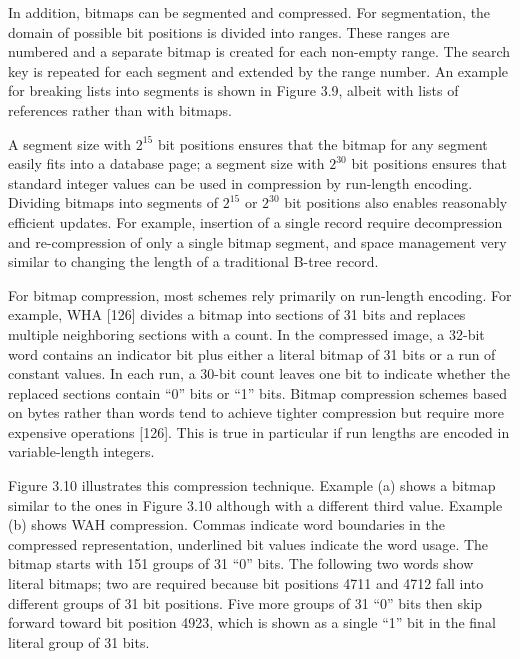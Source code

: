 In addition, bitmaps can be segmented and compressed. For segmentation,
the domain of possible bit positions is divided into ranges. These
ranges are numbered and a separate bitmap is created for each non-empty
range. The search key is repeated for each segment and extended by the
range number. An example for breaking lists into segments is shown in
Figure 3.9, albeit with lists of references rather than with bitmaps.

A segment size with $2^15$ bit positions ensures that the
bitmap for any segment easily fits into a database page; a segment size
with $2^30$ bit positions ensures that standard integer
values can be used in compression by run-length encoding. Dividing
bitmaps into segments of $2^15$ or $2^30$
bit positions also enables reasonably efficient updates. For example,
insertion of a single record require decompression and re-compression of
only a single bitmap segment, and space management very similar to
changing the length of a traditional B-tree record.

For bitmap compression, most schemes rely primarily on run-length
encoding. For example, WHA {[}126{]} divides a bitmap into sections of
31 bits and replaces multiple neighboring sections with a count. In the
compressed image, a 32-bit word contains an indicator bit plus either a
literal bitmap of 31 bits or a run of constant values. In each run, a
30-bit count leaves one bit to indicate whether the replaced sections
contain ``0'' bits or ``1'' bits. Bitmap compression schemes based on
bytes rather than words tend to achieve tighter compression but require
more expensive operations {[}126{]}. This is true in particular if run
lengths are encoded in variable-length integers.

Figure 3.10 illustrates this compression technique. Example (a) shows a
bitmap similar to the ones in Figure 3.10 although with a different
third value. Example (b) shows WAH compression. Commas indicate word
boundaries in the compressed representation, underlined bit values
indicate the word usage. The bitmap starts with 151 groups of 31 ``0''
bits. The following two words show literal bitmaps; two are required
because bit positions 4711 and 4712 fall into different groups of 31 bit
positions. Five more groups of 31 ``0'' bits then skip forward toward
bit position 4923, which is shown as a single ``1'' bit in the final
literal group of 31 bits.

